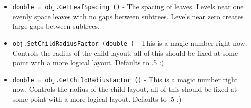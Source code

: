 \begin{itemize}
\item  \verb|double = obj.GetLeafSpacing ()| -  The spacing of leaves.  Levels near one evenly space leaves
 with no gaps between subtrees.  Levels near zero creates
 large gaps between subtrees.

\item  \verb|obj.SetChildRadiusFactor (double )| -  This is a magic number right now. Controls the radius
 of the child layout, all of this should be fixed at
 some point with a more logical layout. Defaults to .5 :)

\item  \verb|double = obj.GetChildRadiusFactor ()| -  This is a magic number right now. Controls the radius
 of the child layout, all of this should be fixed at
 some point with a more logical layout. Defaults to .5 :)

\end{itemize}
